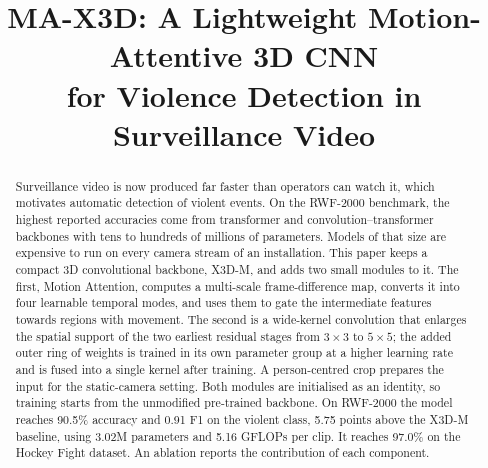 \documentclass[conference]{IEEEtran}
\newif\ifdraft \drafttrue
\newcommand{\res}[1]{\ifdraft{\color{red}#1}\else#1\fi}
\begin{document}
\title{MA-X3D: A Lightweight Motion-Attentive 3D CNN\\
for Violence Detection in Surveillance Video}

\author{
\and
{}
}

\maketitle

\begin{abstract}
Surveillance video is now produced far faster than operators can watch
it, which motivates automatic detection of violent events. On the
RWF-2000 benchmark, the highest reported accuracies come from
transformer and convolution--transformer backbones with tens to
hundreds of millions of parameters. Models of that size are expensive to
run on every camera stream of an installation. This paper keeps a
compact 3D convolutional backbone, X3D-M, and adds two small modules to
it. The first, Motion Attention, computes a multi-scale frame-difference
map, converts it into four learnable temporal modes, and uses them to
gate the intermediate features towards regions with movement. The second
is a wide-kernel convolution that enlarges the spatial support of the
two earliest residual stages from $3\times3$ to $5\times5$; the added
outer ring of weights is trained in its own parameter group at a higher
learning rate and is fused into a single kernel after training. A
person-centred crop prepares the input for the static-camera setting.
Both modules are initialised as an identity, so training starts from the
unmodified pre-trained backbone. On RWF-2000 the model reaches \res{90.5\%}
accuracy and \res{0.91} F1 on the violent class, \res{5.75} points above the X3D-M
baseline, using 3.02M parameters and 5.16 GFLOPs per clip. It reaches
\res{97.0\%} on the Hockey Fight dataset. An ablation reports the contribution
of each component.
\end{abstract}
\end{document}
